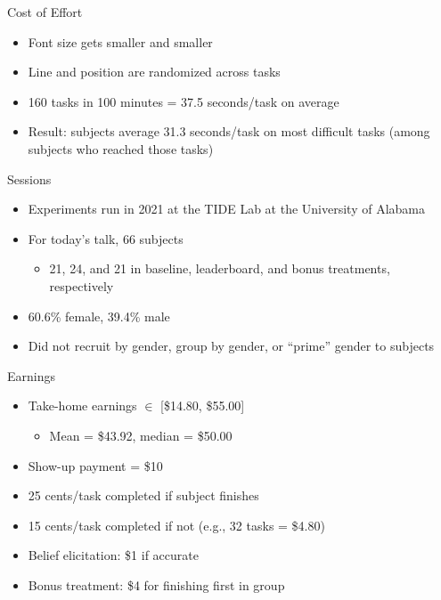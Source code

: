 \documentclass[14pt]{beamer}
\begin{document}
\begin{frame}{Cost of Effort}
\begin{itemize}
	\item Font size gets smaller and smaller 
	\item Line and position are randomized across tasks
	\item 160 tasks in 100 minutes = 37.5 seconds/task on average
	\item Result: subjects average 31.3 seconds/task on most difficult tasks (among subjects who reached those tasks)
\end{itemize}
\end{frame}

\begin{frame}{Sessions}
\begin{itemize}
	\item Experiments run in 2021 at the TIDE Lab at the University of Alabama 
	\item For today's talk, 66 subjects 
	\begin{itemize}
		\item 21, 24, and 21 in baseline, leaderboard, and bonus treatments, respectively
	\end{itemize}
	\item 60.6\% female, 39.4\% male
	\item Did not recruit by gender, group by gender, or ``prime'' gender to subjects
\end{itemize}
\end{frame}

\begin{frame}{Earnings}
\begin{itemize}
	\item Take-home earnings $\in$ [\$14.80, \$55.00]
	\begin{itemize}
		\item Mean = \$43.92, median = \$50.00
	\end{itemize}
	\item Show-up payment = \$10
	\item 25 cents/task completed if subject finishes
	\item 15 cents/task completed if not (e.g., 32 tasks = \$4.80)
	\item Belief elicitation: \$1 if accurate
	\item Bonus treatment: \$4 for finishing first in group
\end{itemize}
\end{frame}
\end{document}
